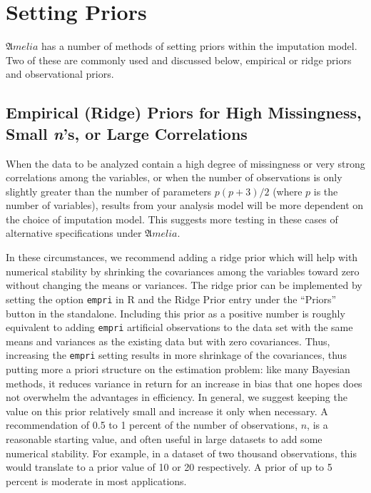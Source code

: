 \documentclass[12pt,titlepage]{article}
\begin{document}
\section{Setting Priors} \label{sec:obspri}

${\mathfrak Amelia}$ has a number of methods of setting priors within
the imputation model.  Two of these are commonly used and discussed
below, empirical or ridge priors and observational priors.

\subsection{Empirical (Ridge) Priors for High Missingness, 
  Small \emph{n}'s, or Large Correlations}\label{sec:prior}

When the data to be analyzed contain a high degree of missingness or
very strong correlations among the variables, or when the number of
observations is only slightly greater than the number of parameters
$p(p+3)/2$ (where $p$ is the number of variables), results from your
analysis model will be more dependent on the choice of imputation
model.  This suggests more testing in these cases of alternative
specifications under ${\mathfrak Amelia}$.

In these circumstances, we recommend adding a ridge prior which will
help with numerical stability by shrinking the covariances among the
variables toward zero without changing the means or variances.  The
ridge prior can be implemented by setting the option \texttt{empri} in
R and the Ridge Prior entry under the ``Priors'' button in the
standalone.  Including this prior as a positive number is roughly
equivalent to adding \texttt{empri} artificial observations to the
data set with the same means and variances as the existing data but
with zero covariances.  Thus, increasing the \texttt{empri} setting
results in more shrinkage of the covariances, thus putting more a
priori structure on the estimation problem: like many Bayesian
methods, it reduces variance in return for an increase in bias that
one hopes does not overwhelm the advantages in efficiency.  In
general, we suggest keeping the value on this prior relatively small
and increase it only when necessary.  A recommendation of 0.5 to 1
percent of the number of observations, $n$, is a reasonable starting
value, and often useful in large datasets to add some numerical
stability.  For example, in a dataset of two thousand observations,
this would translate to a prior value of 10 or 20 respectively.  A
prior of up to 5 percent is moderate in most applications.
\end{document}
